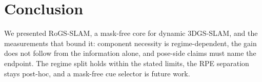 \section{Conclusion}
\enlargethispage{4\baselineskip}


We presented RoGS-SLAM, a mask-free core for dynamic 3DGS-SLAM, and the measurements that bound it: component necessity is regime-dependent, the gain does not follow from the information alone, and pose-side claims must name the endpoint. The regime split holds within the stated limits, the RPE separation stays post-hoc, and a mask-free cue selector is future work.



